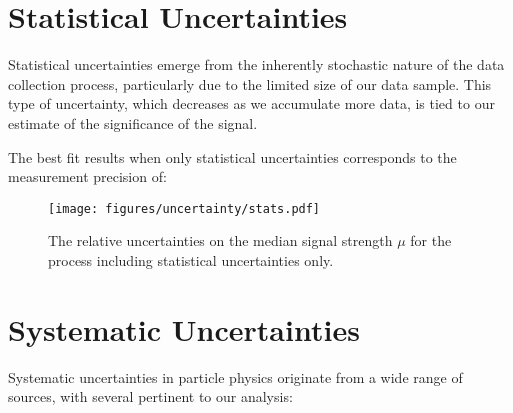 \section{Statistical Uncertainties}

Statistical uncertainties emerge from the inherently stochastic nature of the data collection process, particularly due
to the limited size of our data sample. This type of uncertainty, which decreases as we accumulate more data, is tied to
our estimate of the significance of the \tth signal.

The best fit results when only statistical uncertainties corresponds to the measurement precision of:

\begin{figure}
    \centering
    \texttt{[image: figures/uncertainty/stats.pdf]}
    \caption{The relative uncertainties on the median signal strength $\mu$ for the \tth process including statistical
        uncertainties only.}
    \label{fig:stat}
\end{figure}

\section{Systematic Uncertainties}

Systematic uncertainties in particle physics originate from a wide range of sources, with several pertinent to our
analysis:

